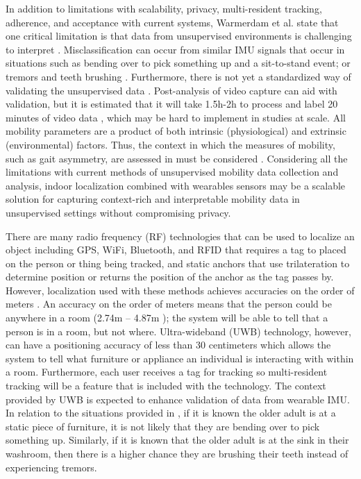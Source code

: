 In addition to limitations with scalability, privacy, multi-resident tracking, adherence, and 
acceptance with current systems, Warmerdam et al. state that one critical limitation is that 
data from unsupervised environments is challenging to interpret \cite{faber_clinimetric_2006}. Misclassification can 
occur from similar IMU signals that occur in situations such as bending over to pick something 
up and a sit-to-stand event; or tremors and teeth brushing \cite{warmerdam_long-term_2020,fasano_wearable-based_2020}. Furthermore, there is not 
yet a standardized way of validating the unsupervised data \cite{warmerdam_long-term_2020}. Post-analysis of video capture 
can aid with validation, but it is estimated that it will take 1.5h-2h to process and label 
20 minutes of video data \cite{bourke_development_2019,bourke_physical_2017}, which may be hard to implement in studies at scale. All 
mobility parameters are a product of both intrinsic (physiological) and extrinsic (environmental) 
factors. Thus, the context in which the measures of mobility, such as gait asymmetry, are 
assessed in must be considered \cite{warmerdam_long-term_2020,fasano_wearable-based_2020,mcgrath_sensor_2014,rantz_new_2015,hutchison_feature_2006}. Considering all the limitations with 
current methods of unsupervised mobility data collection and analysis, indoor localization 
combined with wearables sensors may be a scalable solution for capturing context-rich and 
interpretable mobility data in unsupervised settings without compromising privacy.

There are many radio frequency (RF) technologies that can be used to localize an object 
including GPS, WiFi, Bluetooth, and RFID \cite{wu_comparison_2022,moatamed_low-cost_2016,hung_novel_2021,hutchison_indoor_2010} that requires a tag to placed on the 
person or thing being tracked, and static anchors that use trilateration to determine position 
or returns the position of the anchor as the tag passes by. However, localization used with 
these methods achieves accuracies on the order of meters \cite{wu_comparison_2022,hutchison_indoor_2010}. An accuracy on the order 
of meters means that the person could be anywhere in a room (2.74m – 4.87m \cite{mahajan_standard_2019}); the system 
will be able to tell that a person is in a room, but not where. Ultra-wideband (UWB) technology, 
however, can have a positioning accuracy of less than 30 centimeters \cite{wu_comparison_2022} which allows the system 
to tell what furniture or appliance an individual is interacting with within a room. Furthermore, 
each user receives a tag for tracking so multi-resident tracking will be a feature that is 
included with the technology. The context provided by UWB is expected to enhance validation of 
data from wearable IMU. In relation to the situations provided in \cite{warmerdam_long-term_2020,fasano_wearable-based_2020}, if it is known the 
older adult is at a static piece of furniture, it is not likely that they are bending over to pick 
something up. Similarly, if it is known that the older adult is at the sink in their washroom, then 
there is a higher chance they are brushing their teeth instead of experiencing tremors.

